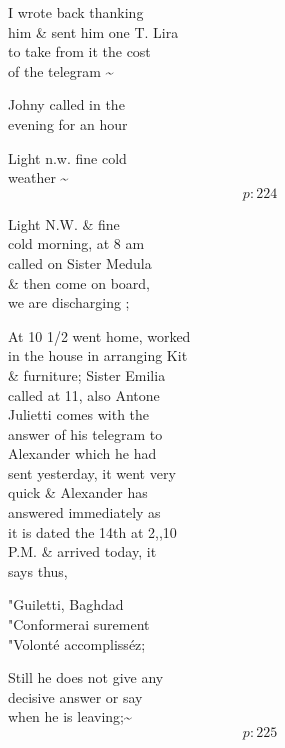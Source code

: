 \documentclass{report}
\begin{document}
	\par{
 	I wrote back thanking\ \\him \& sent him one T. Lira\ \\to take from it the cost\ \\of the telegram \~{}\ \\
	}

	\par{
 	Johny called in the\ \\evening for an hour\ \\
	}

	\par{
 	Light n.w. fine cold\ \\weather \~{}\ \\
  \[p: 224 \]

	}

	\par{
 	Light N.W. \& fine\ \\cold morning, at 8 am\ \\called on Sister Medula\ \\\& then come on board,\ \\we are discharging ;\ \\
	}

	\par{
 	At 10 1/2 went home, worked\ \\in the house in arranging Kit\ \\\& furniture; Sister Emilia\ \\called at 11, also Antone\ \\Julietti comes with the\ \\answer of his telegram to\ \\Alexander which he had\ \\sent yesterday, it went very\ \\quick \& Alexander has\ \\answered immediately as\ \\it is dated the 14th at 2,,10\ \\P.M. \& arrived today, it\ \\says thus,\ \\
	}

	\par{
 	"Guiletti, Baghdad\ \\"Conformerai surement\ \\"Volonté accomplisséz;\ \\
	}

	\par{
 	Still he does not give any\ \\decisive answer or say\ \\when he is leaving;\~{}\ \\
  \[p: 225 \]

	}
\end{document}
